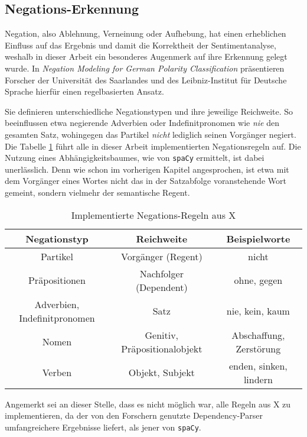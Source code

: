 \subsection{Negations-Erkennung}
\label{neg-erkennung}
Negation, also Ablehnung, Verneinung oder Aufhebung, hat einen erheblichen Einfluss auf das Ergebnis und damit die Korrektheit der Sentimentanalyse, weshalb in dieser Arbeit ein besonderes Augenmerk auf ihre Erkennung gelegt wurde. 
In \textit{Negation Modeling for German Polarity Classification} präsentieren Forscher der Universität des Saarlandes und des Leibniz-Institut für Deutsche Sprache hierfür einen regelbasierten Ansatz. 

Sie definieren unterschiedliche Negationstypen und ihre jeweilige Reichweite. 
So beeinflussen etwa negierende Adverbien oder Indefinitpronomen wie \textit{nie} den gesamten Satz, wohingegen das Partikel \textit{nicht} lediglich seinen Vorgänger negiert.  
Die Tabelle \ref{tab1} führt alle in dieser Arbeit implementierten Negationsregeln auf. 
Die Nutzung eines Abhängigkeitsbaumes, wie von \texttt{spaCy} ermittelt, ist dabei unerlässlich. 
Denn wie schon im vorherigen Kapitel angesprochen, ist etwa mit dem Vorgänger eines Wortes nicht das in der Satzabfolge voranstehende Wort gemeint, sondern vielmehr der semantische Regent. 

\begin{table}[htbp]
\caption{Implementierte Negations-Regeln aus X}
\begin{center}
\begin{tabular}{| c | c | c |}
\hline
Negationstyp & Reichweite & Beispielworte \\ \hline
Partikel & Vorgänger (Regent) & nicht \\ \hline
Präpositionen & Nachfolger (Dependent) & ohne, gegen \\ \hline
Adverbien, Indefinitpronomen & Satz & nie, kein, kaum \\ \hline
Nomen & Genitiv, Präpositionalobjekt & Abschaffung, Zerstörung \\ \hline
Verben & Objekt, Subjekt & enden, sinken, lindern \\
\hline
\end{tabular}
\label{tab1}
\end{center}
\end{table}

Angemerkt sei an dieser Stelle, dass es nicht möglich war, alle Regeln aus X zu implementieren, da der von den Forschern genutzte Dependency-Parser umfangreichere Ergebnisse liefert, als jener von \texttt{spaCy}. 

